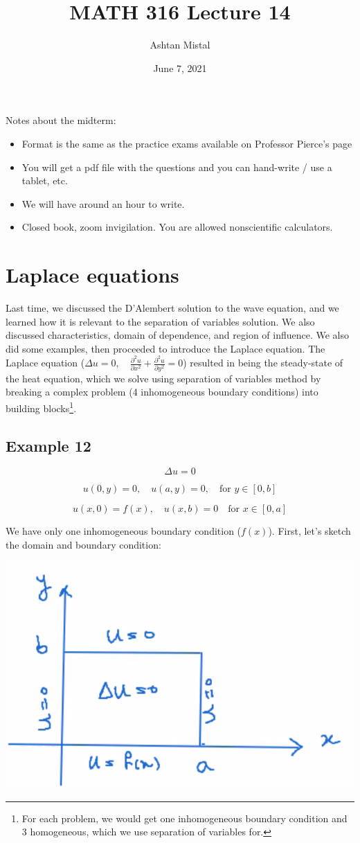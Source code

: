 \documentclass{article}
\title{MATH 316 Lecture 14}
\author{Ashtan Mistal}
\date{June 7, 2021}
\begin{document}
\ifstandalone
\maketitle
\fi

\graphicspath{{./Lecture14/}}

Notes about the midterm:

\begin{itemize}
    \item Format is the same as the practice exams available on Professor Pierce's page
    \item You will get a pdf file with the questions and you can hand-write / use a tablet, etc. 
    \item We will have around an hour to write. 
    \item Closed book, zoom invigilation. You are allowed nonscientific calculators. 
\end{itemize}

\section{Laplace equations}

Last time, we discussed the D'Alembert solution to the wave equation, and we learned how it is relevant to the separation of variables solution. We also discussed characteristics, domain of dependence, and region of influence. We also did some examples, then proceeded to introduce the Laplace equation. The Laplace equation ($ \Delta u = 0, \quad \frac{\partial^2 u}{\partial x^2} + \frac{\partial^2 u}{\partial y^2} = 0$) resulted in being the steady-state of the heat equation, which we solve using separation of variables method by breaking a complex problem (4 inhomogeneous boundary conditions) into building blocks\footnote{For each problem, we would get one inhomogeneous boundary condition and 3 homogeneous, which we use separation of variables for. }. 

\subsection{Example 12}

$$\Delta u = 0$$

$$u(0,y) = 0, \quad u(a,y) = 0, \quad \text{for } y \in [0,b]$$

$$u(x,0) = f(x), \quad u(x,b) = 0 \quad \text{for } x \in [0,a]$$

We have only one inhomogeneous boundary condition ($f(x)$). First, let's sketch the domain and boundary condition:
\begin{center}
    \includegraphics[width = 0.6 \textwidth]{image1.png}
\end{center}
\end{document}
